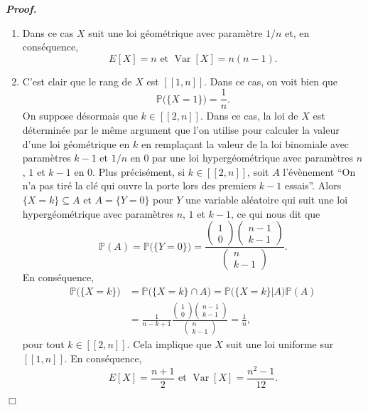 \documentclass[11pt,a4paper]{article}
\newenvironment{preuve}[1][]
{\vskip 2mm  \noindent\emph{\bf Proof#1. }}{$\Box$ \vskip 2mm}
\begin{document}
		\begin{preuve}
			\begin{enumerate}
				\item Dans ce cas $X$ suit une loi géométrique avec paramètre $1/n$ et, en conséquence, 
				\[     E[X] = n \text{ et } \operatorname{Var}[X] = n(n-1).     \]
				\item C'est clair que le rang de $X$ est $[\![ 1 , n ]\!]$. 
				Dans ce cas, on voit bien que 
				\[     \mathbb{P}\big( \{ X = 1 \}\big) = \frac{1}{n}.     \]
				On suppose désormais que $k \in [\![ 2, n ]\!]$. 
				Dans ce cas, la loi de $X$ est déterminée par le même argument que l'on utilise pour calculer la valeur d'une loi géométrique en $k$ en remplaçant la valeur de la loi binomiale avec paramètres $k-1$ et $1/n$ en $0$ par une loi hypergéométrique avec paramètres $n$, $1$ et $k-1$ en $0$. 
				Plus précisément, si $k \in [\![ 2, n ]\!]$, soit $A$ l'évènement ``On n'a pas tiré la clé qui ouvre la porte lors des premiers $k-1$ essais''. 
				Alors $\{ X = k \} \subseteq A$ et $A = \{ Y = 0 \}$ pour $Y$ une variable aléatoire qui suit une loi hypergéométrique avec paramètres $n$, $1$ et $k-1$, ce qui nous dit que 
				\[     \mathbb{P}(A) = \mathbb{P}\big( \{ Y = 0 \}\big) = \frac{\begin{pmatrix} 1 \\ 0  \end{pmatrix} \begin{pmatrix} n-1 \\ k-1  \end{pmatrix}}{\begin{pmatrix} n \\ k-1  \end{pmatrix}}.     \]
				En conséquence, 
				\begin{align*}
				\mathbb{P}\big( \{ X = k \}\big) &= \mathbb{P}\big( \{ X = k\} \cap A \big) = \mathbb{P}\big( \{ X = k \} | A \big) \mathbb{P}(A) \\
				&= \frac{1}{n-k+1} \frac{\begin{pmatrix} 1 \\ 0  \end{pmatrix} \begin{pmatrix} n-1 \\ k-1  \end{pmatrix}}{\begin{pmatrix} n \\ k-1  \end{pmatrix}} = \frac{1}{n},      
				\end{align*}
				pour tout $k \in [\![ 2, n ]\!]$. 
				Cela implique que $X$ suit une loi uniforme sur $[\![ 1 , n ]\!]$. 
				En conséquence, 
				\[     E[X] = \frac{n+1}{2} \text{ et } \operatorname{Var}[X] = \frac{n^{2}-1}{12}.     \]
			\end{enumerate}
		\end{preuve}
		
\end{document}
